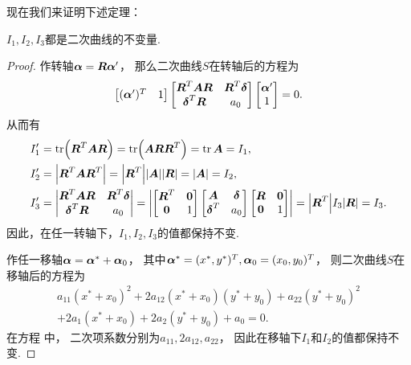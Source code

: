 现在我们来证明下述定理：
\begin{theorem}
\(I_1,I_2,I_3\)都是二次曲线的不变量.
\begin{proof}
作转轴\(\boldsymbol\alpha = \boldsymbol{R} \boldsymbol\alpha'\)，
那么二次曲线\(S\)在转轴后的方程为\begin{equation*}
	\begin{bmatrix}
		(\boldsymbol\alpha')^T & 1
	\end{bmatrix}
	\begin{bmatrix}
		\boldsymbol{R}^T \boldsymbol{A} \boldsymbol{R} & \boldsymbol{R}^T \boldsymbol\delta \\
		\boldsymbol\delta^T \boldsymbol{R} & a_0
	\end{bmatrix}
	\begin{bmatrix}
		\boldsymbol\alpha' \\ 1
	\end{bmatrix}
	= 0.
\end{equation*}
从而有\begin{align*}
	I_1'
	&= \tr(\boldsymbol{R}^T \boldsymbol{A} \boldsymbol{R})
	= \tr(\boldsymbol{A} \boldsymbol{R} \boldsymbol{R}^T)
	= \tr\boldsymbol{A}
	= I_1, \\
	I_2'
	&= \abs{\boldsymbol{R}^T \boldsymbol{A} \boldsymbol{R}^T}
	= \abs{\boldsymbol{R}^T} \abs{\boldsymbol{A}} \abs{\boldsymbol{R}}
	= \abs{\boldsymbol{A}}
	= I_2, \\
	I_3'
	&= \begin{vmatrix}
		\boldsymbol{R}^T \boldsymbol{A} \boldsymbol{R} & \boldsymbol{R}^T \boldsymbol\delta \\
		\boldsymbol\delta^T \boldsymbol{R} & a_0
	\end{vmatrix}
	= \abs{
		\begin{bmatrix}
			\boldsymbol{R}^T & \boldsymbol0 \\
			\boldsymbol0 & 1
		\end{bmatrix}
		\begin{bmatrix}
			\boldsymbol{A} & \boldsymbol\delta \\
			\boldsymbol\delta^T & a_0
		\end{bmatrix}
		\begin{bmatrix}
			\boldsymbol{R} & \boldsymbol0 \\
			\boldsymbol0 & 1
		\end{bmatrix}
	}
	= \abs{\boldsymbol{R}^T} I_3 \abs{\boldsymbol{R}}
	= I_3.
\end{align*}
因此，在任一转轴下，\(I_1,I_2,I_3\)的值都保持不变.

作任一移轴\(\boldsymbol\alpha = \boldsymbol\alpha^* + \boldsymbol\alpha_0\)，
其中\(
	\boldsymbol\alpha^* = (x^*,y^*)^T,
	\boldsymbol\alpha_0 = (x_0,y_0)^T
\)，
则二次曲线\(S\)在移轴后的方程为\begin{equation}\label{equation:二次曲线方程的不变量.移轴后的方程}
	\begin{array}{r}
		a_{11} (x^* + x_0)^2
		+ 2 a_{12} (x^* + x_0) (y^* + y_0)
		+ a_{22} (y^* + y_0)^2 \\
		+ 2 a_1 (x^* + x_0)
		+ 2 a_2 (y^* + y_0)
		+ a_0
		= 0.
	\end{array}
\end{equation}
在方程  中，
二次项系数分别为\(a_{11},2 a_{12},a_{22}\)，
因此在移轴下\(I_1\)和\(I_2\)的值都保持不变.


\end{proof}
\end{theorem}

